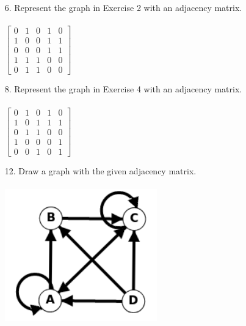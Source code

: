 \begin{itemize}
      \item[6.]  Represent the graph in Exercise 2 with an adjacency matrix. \\
            \answer \vspace{1mm} \\
            $
                  \begin{bmatrix}
                        0 & 1 & 0 & 1 & 0 \\
                        1 & 0 & 0 & 1 & 1 \\
                        0 & 0 & 0 & 1 & 1 \\
                        1 & 1 & 1 & 0 & 0 \\
                        0 & 1 & 1 & 0 & 0
                  \end{bmatrix}
            $

      \item[8.] Represent the graph in Exercise 4 with an adjacency matrix. \\
            \answer \vspace{1mm} \\
            $
                  \begin{bmatrix}
                        0 & 1 & 0 & 1 & 0 \\
                        1 & 0 & 1 & 1 & 1 \\
                        0 & 1 & 1 & 0 & 0 \\
                        1 & 0 & 0 & 0 & 1 \\
                        0 & 0 & 1 & 0 & 1
                  \end{bmatrix}
            $

      \item[12.] Draw a graph with the given adjacency matrix. \\
            \answer \\
            \includegraphics[scale = 0.7]{img/10_3_12_graph.png}


\end{itemize}
